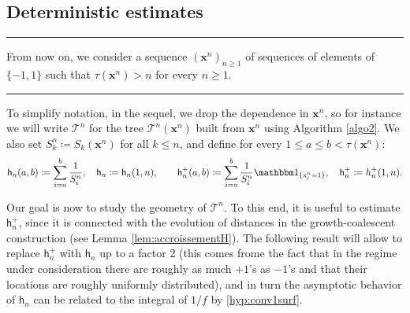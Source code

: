 \documentclass[11pt]{article}
\theoremstyle{plain}
\theoremstyle{definition}
\theoremstyle{remark}
\newcommand{\1}{\mathbbm{1}} %
\newcommand{\T}{\mathcal{T}} %
\newcommand{\h}{\mathsf{h}} %
\newcommand{\Xb}{\mathrm{\mathbf{x}}} %
\newcommand{\X}{\mathrm x} %
\begin{document}
\subsection{Deterministic estimates}
\label{ssec:estimates}



\begin{center}

\noindent\rule{0.8\textwidth}{1pt}

From now on, we consider a sequence $(\Xb^n)_{n \geq 1}$ of sequences of elements of $\{-1,1\}$ such that $\tau(\Xb^n)>n$ for every $n \geq 1$.

\noindent\rule{0.8\textwidth}{1pt}
\end{center}








To simplify notation, in the sequel, we drop the dependence in $\Xb^n$, so for instance we will write $\T^n$ for the tree $\T^n(\Xb^n)$ built from $\Xb^{n}$ using Algorithm \ref{algo2}. We also set $S_k^n \coloneqq S_k(\Xb^n)$ for all $k\leq n$, and define  for every $1\leq a \leq b < \tau(\Xb^{n})$:
\begin{equation}
\label{eq:defhn}
\h_{n}(a,b) \coloneqq \sum_{i=a}^b \frac{1}{S^{n}_i},  \quad \h_{n} \coloneqq \h_{n}(1,n), \qquad \h_{n}^{+}(a,b)  \coloneqq \sum_{i=a}^b \frac{1}{S^{n}_i} \mathbbm 1_{\{\X^{n}_i=1\}}, \quad  \h_{n}^{+} \coloneqq h_{n}^{+}(1,n).
\end{equation}



Our goal is now to study the geometry of $\T^n$.
To this end, it is useful to estimate $\h_{n}^{+}${, since it is  connected with the evolution of distances in the growth-coalescent construction (see Lemma \ref{lem:accroissementH}). The following result will allow to replace $\h_{n}^{+}$ with $\h_{n}$ up to a factor $2$ (this comes frome the fact that  in the regime under consideration there are roughly as much $+1$'s as $-1$'s and that their locations are roughly uniformly distributed), and in turn the asymptotic behavior of $\h_{n}$ can be related to the integral of $1/f$ by \ref{hyp:conv1surf}.}
\end{document}
